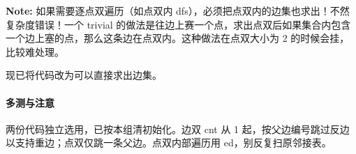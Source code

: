\textbf{Note: } 如果需要逐点双遍历（如点双内 dfs），必须把点双内的边集也求出！不然复杂度错误！一个 trivial 的做法是往边上赛一个点，求出点双后如果集合内包含一个边上塞的点，那么这条边在点双内。这种做法在点双大小为 2 的时候会挂，比较难处理。

现已将代码改为可以直接求出边集。

\paragraph{多测与注意} 两份代码独立选用，已按本组清初始化。边双 cnt 从 1 起，按父边编号跳过反边以支持重边；点双仅跳一条父边。点双内部遍历用 ed，别反复扫原邻接表。
